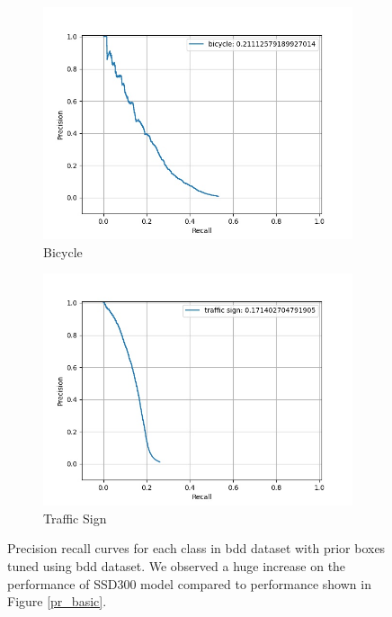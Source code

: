 \begin{figure}
        \begin{center}
        	\begin{subfigure}[t]{0.33\textwidth}
        		\centering
        		\includegraphics[width=\textwidth]{images/tuned_pr/class_bicycle_pr.jpg}
        		\caption{Bicycle}
        	\end{subfigure}
        	\begin{subfigure}[t]{0.33\textwidth}
        		\centering
        		\includegraphics[width=\textwidth]{images/tuned_pr/class_traffic sign_pr.jpg}
        		\caption{Traffic Sign}
        	\end{subfigure}
            \caption[PR curves with tuned prior boxes]{Precision recall curves for each class in \acrshort{bdd} dataset with prior boxes tuned using \acrshort{bdd} dataset. We observed a huge increase on the performance of SSD300 model compared to performance shown in Figure \ref{pr_basic}.}
        \end{center}
    \end{figure}
    
